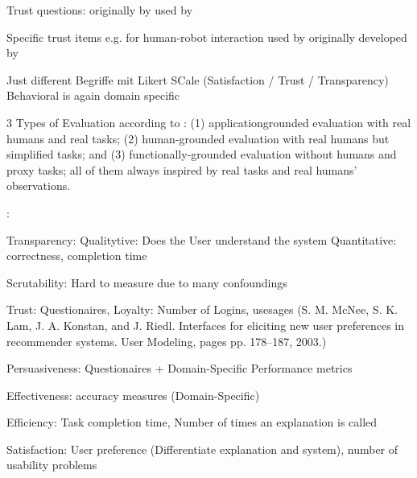 Trust questions: originally by \cite{mayer1999effect} used by \cite{wang_is_2018}

Specific trust items e.g. for human-robot interaction used by \cite{zhu_effects_2020} originally developed by \cite{schaefer2013perception}

Just different Begriffe mit Likert SCale (Satisfaction / Trust / Transparency) \cite{koo_understanding_2016, koo_why_2015} Behavioral is again domain specific

3 Types of Evaluation according to \cite{ribera2019can, doshi2017towards}: (1) applicationgrounded evaluation with real humans and real tasks; (2) human-grounded evaluation with real humans but simplified tasks; and (3) functionally-grounded evaluation without humans and proxy tasks; all of them always inspired by real tasks and real humans’ observations.

 \cite{tintarev2007survey}:
 
 Transparency: Qualitytive: Does the User understand the system Quantitative: correctness, completion time
 
 Scrutability: Hard to measure due to many confoundings
 
 Trust: Questionaires, Loyalty: Number of Logins, usesages (S. M. McNee, S. K. Lam, J. A. Konstan, and J. Riedl. Interfaces for eliciting new user preferences in recommender systems. User Modeling, pages pp. 178–187, 2003.)
 
 Persuasiveness: Questionaires + Domain-Specific Performance metrics
 
 Effectiveness: accuracy measures (Domain-Specific) 
 
 Efficiency: Task completion time, Number of times an explanation is called
 
 Satisfaction: User preference (Differentiate explanation and system), number of usability problems
 
 